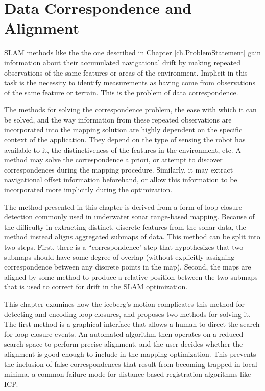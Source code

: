 
\chapter{Data Correspondence and Alignment}
\label{ch.LoopClosure}

SLAM methods like the the one described in Chapter \ref{ch.ProblemStatement} gain information about their accumulated navigational drift by making repeated observations of the same features or areas of the environment. Implicit in this task is the necessity to identify measurements as having come from observations of the same feature or terrain. This is the problem of data correspondence. 

The methods for solving the correspondence problem, the ease with which it can be solved, and the way information from these repeated observations are incorporated into the mapping solution are highly dependent on the specific context of the application. They depend on the type of sensing the robot has available to it, the distinctiveness of the features in the environment, etc. A method may solve the correspondence a priori, or attempt to discover correspondences during the mapping procedure. Similarly, it may extract navigational offset information beforehand, or allow this information to be incorporated more implicitly during the optimization.

The method presented in this chapter is derived from a form of loop closure detection commonly used in underwater sonar range-based mapping. Because of the difficulty in extracting distinct, discrete features from the sonar data, the method instead aligns aggregated submaps of data. This method can be split into two steps. First, there is a ``correspondence" step that hypothesizes that two submaps should have some degree of overlap (without explicitly assigning correspondence between any discrete points in the map). Second, the maps are aligned by some method to produce a relative position between the two submaps that is used to correct for drift in the SLAM optimization. 

This chapter examines how the iceberg's motion complicates this method for detecting and encoding loop closures, and proposes two methods for solving it. The first method is a graphical interface that allows a human to direct the search for loop closure events. An automated algorithm then operates on a reduced search space to perform precise alignment, and the user decides whether the alignment is good enough to include in the mapping optimization. This prevents the inclusion of false correspondences that result from becoming trapped in local minima, a common failure mode for distance-based registration algorithms like ICP.

